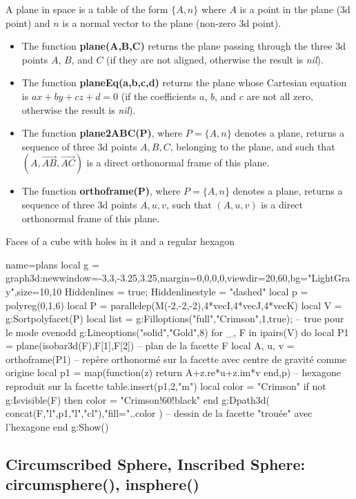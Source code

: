A plane in space is a table of the form $\{A,n\}$ where $A$ is a point in the plane (3d point) and $n$ is a normal vector to the plane (non-zero 3d point).
\begin{itemize}
    \item The function \textbf{plane(A,B,C)} returns the plane passing through the three 3d points $A$, $B$, and $C$ (if they are not aligned, otherwise the result is \emph{nil}).
    \item The function \textbf{planeEq(a,b,c,d)} returns the plane whose Cartesian equation is $ax+by+cz+d=0$ (if the coefficients $a$, $b$, and $c$ are not all zero, otherwise the result is \emph{nil}).
    \item The function \textbf{plane2ABC(P)}, where $P=\{A,n\}$ denotes a plane, returns a sequence of three 3d points $A,B,C$, belonging to the plane, and such that $(A,\vec{AB},\vec{AC})$ is a direct orthonormal frame of this plane.
    \item The function \textbf{orthoframe(P)}, where $P=\{A,n\}$ denotes a plane, returns a sequence of three 3d points $A,u,v$, such that $(A,u,v)$ is a direct orthonormal frame of this plane.
\end{itemize}

\begin{demo}{Faces of a cube with holes in it and a regular hexagon}
\begin{luadraw}{name=plans}
local g = graph3d:new{window={-3,3,-3.25,3.25},margin={0,0,0,0},viewdir={20,60},bg="LightGray",size={10,10}}
Hiddenlines = true; Hiddenlinestyle = "dashed"
local p = polyreg(0,1,6)
local P = parallelep(M(-2,-2,-2),4*vecI,4*vecJ,4*vecK)
local V = g:Sortpolyfacet(P)
local list = {}
g:Filloptions("full","Crimson",1,true); -- true pour le mode evenodd
g:Lineoptions("solid","Gold",8)
for _, F in  ipairs(V) do
    local P1 = plane(isobar3d(F),F[1],F[2]) -- plan de la facette F
    local A, u, v = orthoframe(P1)  -- repère orthonormé sur la facette avec centre de gravité comme origine
    local p1 = map(function(z) return A+z.re*u+z.im*v end,p) -- hexagone reproduit sur la facette
    table.insert(p1,2,"m")
    local color = "Crimson"
    if not g:Isvisible(F) then  color = "Crimson!60!black" end
    g:Dpath3d( concat(F,{"l"},p1,{"l","cl"}),"fill="..color ) -- dessin de la facette "trouée" avec l'hexagone
end
g:Show()
\end{luadraw}
\end{demo}

\subsection{Circumscribed Sphere, Inscribed Sphere: circumsphere(), insphere()}

